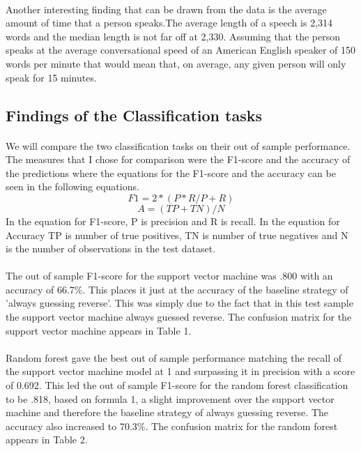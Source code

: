 \documentclass[12pt,english]{article}
\begin{document}
\paragraph{}
Another interesting finding that can be drawn from the data is the average amount of time that a person speaks.The average length of a speech is 2,314 words and the median length is not far off at 2,330. Assuming that the person speaks at the average conversational speed of an American English speaker of 150 words per minute \citep{noauthor_national_nodate} that would mean that, on average, any given person will only speak for 15 minutes.
\subsection{Findings of the Classification tasks}
\paragraph{}
 We will compare the two classification tasks on their out of sample performance. The measures that I chose for comparison were the F1-score and the accuracy of the predictions where the equations for the F1-score and the accuracy can be seen in the following equations.
\[F1= 2*(P*R/P+R)\]
\[A=(TP+TN)/N\]
In the equation for F1-score, P is precision and R is recall.
In the equation for Accuracy TP is number of true positives, TN is number of true negatives and N is the number of observations in the test dataset.
\paragraph{}
The out of sample F1-score for the support vector machine was .800 with an accuracy of 66.7\%. This places it just at the accuracy of the baseline strategy of 'always guessing reverse'. This was simply due to the fact that in this test sample the support vector machine always guessed reverse. The confusion matrix for the support vector machine appears in Table 1. 
\paragraph{}
Random forest gave the best out of sample performance matching the recall of the support vector machine model at 1 and surpassing it in precision with a score of 0.692. This led the out of sample F1-score for the random forest classification to be .818, based on formula 1, a slight improvement over the support vector machine and therefore the baseline strategy of always guessing reverse. The accuracy also increased to 70.3\%. The confusion matrix for the random forest appears in Table 2. 
\end{document}
